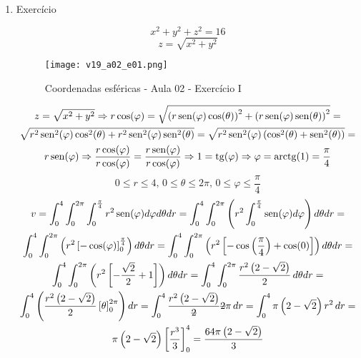 \begin{enumerate}
	\item Exercício
	
	\begin{equation*}
		x^2 + y^2 + z^2 = 16
	\end{equation*}
	\begin{equation*}
		z = \sqrt{x^2 + y^2}
	\end{equation*}
	
	\begin{figure}[htb]
		\caption{Coordenadas esféricas - Aula 02 - Exercício I}
		\label{v19_a02_e01}
		\centering
		\texttt{[image: v19\_a02\_e01.png]}		
	\end{figure}
	
	\begin{gather*}
		z = \sqrt{x^2 + y^2} \Rightarrow r\cos(\varphi) = \sqrt{\left(r\operatorname{sen}(\varphi)\cos(\theta)\right)^2 + \left(r\operatorname{sen}(\varphi)\operatorname{sen}(\theta)\right)^2} =\\ \sqrt{r^2\operatorname{sen}^2(\varphi)\cos^2(\theta) + r^2\operatorname{sen}^2(\varphi)\operatorname{sen}^2(\theta)} = \sqrt{r^2\operatorname{sen}^2(\varphi)\left(\cos^2(\theta) + \operatorname{sen}^2(\theta)\right)} =\\ r\operatorname{sen}(\varphi) \Rightarrow \dfrac{r\cos(\varphi)}{r\cos(\varphi)} = \dfrac{r\operatorname{sen}(\varphi)}{r\cos(\varphi)} \Rightarrow 1 = \operatorname{tg}(\varphi) \Rightarrow \varphi = \operatorname{arctg}(1) = \dfrac{\pi}{4}
	\end{gather*}
	\begin{equation*}
		0 \leq r \leq 4,\, 0 \leq \theta \leq 2\pi,\, 0 \leq \varphi \leq \dfrac{\pi}{4}
	\end{equation*}
	\begin{gather*}
		v = \int_0^4 \int_0^{2\pi} \int_0^{\frac{\pi}{4}} r^2\sen(\varphi) d\varphi d\theta dr = \int_0^4 \int_0^{2\pi}\left(r^2\int_0^{\frac{\pi}{4}} \sen(\varphi) d\varphi\right)d\theta dr =\\ \int_0^4 \int_0^{2\pi}\left(r^2\left[-\cos(\varphi)\right]_0^{\frac{\pi}{4}}\right)d\theta dr = \int_0^4 \int_0^{2\pi}\left(r^2\left[-\cos\left(\dfrac{\pi}{4}\right) + \cos(0)\right]\right)d\theta dr =\\ \int_0^4 \int_0^{2\pi}\left(r^2\left[-\dfrac{\sqrt{2}}{2} + 1\right]\right)d\theta dr = \int_0^4 \int_0^{2\pi} \dfrac{r^2\left(2 - \sqrt{2}\right)}{2}\, d\theta dr =\\ \int_0^4 \left(\dfrac{r^2\left(2 - \sqrt{2}\right)}{2}\left[\theta\right]_0^{2\pi}\right) dr = \int_0^4 \dfrac{r^2\left(2 - \sqrt{2}\right)}{\overstrike{2}}\overstrike{2}\pi\, dr = \int_0^4 \pi\left(2 - \sqrt{2}\right)r^2\, dr =\\ \pi\left(2 - \sqrt{2}\right) \left[\dfrac{r^3}{3}\right]_0^4 = \dfrac{64\pi\left(2 - \sqrt{2}\right)}{3}
	\end{gather*}
\end{enumerate}